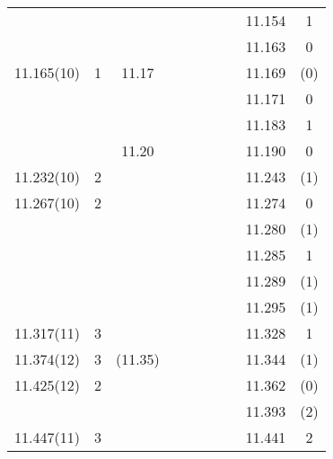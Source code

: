 \begin{landscape}
\begin{center}
\begin{longtable}{cc cc cc cc cc}
                &              &          &         &            &                &       &          & 11.154   & 1    \\
                &              &          &         &            &                &       &          & 11.163   & 0    \\
    11.165(10)  & 1            & 11.17    &         &            &                &       &          & 11.169   & (0)  \\
                &              &          &         &            &                &       &          & 11.171   & 0    \\
                &              &          &         &            &                &       &          & 11.183   & 1    \\
                &              & 11.20    &         &            &                &       &          & 11.190   & 0    \\
    11.232(10)  & 2            &          &         &            &                &       &          & 11.243   & (1)  \\
    11.267(10)  & 2            &          &         &            &                &       &          & 11.274   & 0    \\
                &              &          &         &            &                &       &          & 11.280   & (1)  \\
                &              &          &         &            &                &       &          & 11.285   & 1    \\
                &              &          &         &            &                &       &          & 11.289   & (1)  \\
                &              &          &         &            &                &       &          & 11.295   & (1)  \\
    11.317(11)  & 3            &          &         &            &                &       &          & 11.328   & 1    \\
    11.374(12)  & 3            &(11.35)   &         &            &                &       &          & 11.344   & (1)  \\
    11.425(12)  & 2            &          &         &            &                &       &          & 11.362   & (0)  \\
                &              &          &         &            &                &       &          & 11.393   & (2)  \\
    11.447(11)  & 3            &          &         &            &                &       &          & 11.441   & 2    \\

\end{longtable}
\end{center}
\end{landscape}
